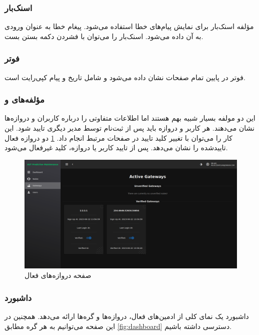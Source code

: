 \subsubsection{اسنک‌بار}

مؤلفه اسنک‌بار برای نمایش پیام‌های خطا استفاده می‌شود. پیغام خطا به عنوان ورودی به آن داده می‌شود. اسنک‌بار را می‌توان با فشردن دکمه بستن بست.


\subsubsection{فوتر}

فوتر در پایین تمام صفحات نشان داده می‌شود و شامل تاریخ و پیام کپی‌رایت است.

\subsubsection{مؤلفه‌های  و }

این دو مولفه بسیار شبیه بهم هستند اما اطلاعات متفاوتی را درباره کاربران و دروازه‌ها نشان می‌دهند. هر کاربر و دروازه باید پس از ثبت‌نام توسط مدیر دیگری تایید شود. این کار را می‌توان با تغییر کلید تایید در صفحات مرتبط انجام داد. \cref{fig:gateway_page} دو دروازه فعال تاییدشده را نشان می‌دهد. پس از تایید کاربر یا دروازه، کلید غیرفعال می‌شود.

\begin{figure}[!h]
\centering\includegraphics[scale=.38]{gateway_page.png}
\caption{صفحه دروازه‌های فعال}\label{fig:gateway_page}
\end{figure}

\subsubsection{داشبورد}

داشبورد یک نمای کلی از ادمین‌های فعال، دروازه‌ها و گره‌ها ارائه می‌دهد. همچنین در این صفحه می‌توانیم به هر گره مطابق \cref{fig:dashboard} دسترسی داشته باشیم.

